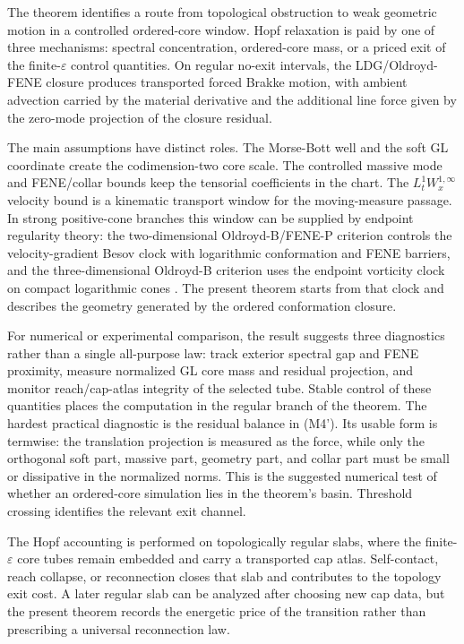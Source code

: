 \documentclass[11pt]{article}
\theoremstyle{definition}
\newcommand{\eps}{\varepsilon}
\begin{document}
The theorem identifies a route from topological obstruction to weak geometric
motion in a controlled ordered-core window.  Hopf relaxation is paid by one of
three mechanisms: spectral concentration, ordered-core mass, or a priced exit of
the finite-\(\eps\) control quantities.  On regular no-exit intervals, the
LDG/Oldroyd-FENE closure produces transported forced Brakke motion, with ambient
advection carried by the material derivative and the additional line force given
by the zero-mode projection of the closure residual.

The main assumptions have distinct roles.  The Morse-Bott well and the soft GL
coordinate create the codimension-two core scale.  The controlled massive mode
and FENE/collar bounds keep the tensorial coefficients in the chart.  The
\(L^1_tW^{1,\infty}_x\) velocity bound is a kinematic transport window for the
moving-measure passage.  In strong positive-cone branches this window can be
supplied by endpoint regularity theory: the two-dimensional Oldroyd-B/FENE-P
criterion controls the velocity-gradient Besov clock with logarithmic
conformation and FENE barriers, and the three-dimensional Oldroyd-B criterion
uses the endpoint vorticity clock on compact logarithmic cones
\cite{PengBlowUp2026,PengPositiveCone3D2026}.  The present theorem starts from
that clock and describes the geometry generated by the ordered conformation
closure.

For numerical or experimental comparison, the result suggests three diagnostics
rather than a single all-purpose law: track exterior spectral gap and FENE
proximity, measure normalized GL core mass and residual projection, and monitor
reach/cap-atlas integrity of the selected tube.  Stable control of these
quantities places the computation in the regular branch of the theorem.  The
hardest practical diagnostic is the residual balance in (M4').  Its usable form is
termwise: the translation projection is measured as the force, while only the
orthogonal soft part, massive part, geometry part, and collar part must be small
or dissipative in the normalized norms.  This is the suggested numerical test of
whether an ordered-core simulation lies in the theorem's basin.
Threshold crossing identifies the relevant exit channel.

The Hopf accounting is performed on topologically regular slabs, where the
finite-\(\eps\) core tubes remain embedded and carry a transported cap atlas.
Self-contact, reach collapse, or reconnection closes that slab and contributes
to the topology exit cost.  A later regular slab can be analyzed after choosing
new cap data, but the present theorem records the energetic price of the
transition rather than prescribing a universal reconnection law.
\end{document}
